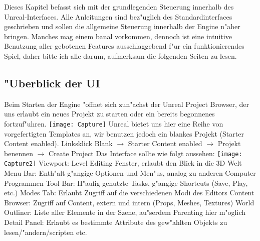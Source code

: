 \documentclass[11pt, titlepage]{article}
\begin{document}
\noindent Dieses Kapitel befasst sich mit der grundlegenden Steuerung innerhalb des Unreal-Interfaces. Alle Anleitungen sind bez"uglich des Standardinterfaces geschrieben und sollen die allgemeine Steuerung innerhalb der Engine n"aher bringen. Manches mag einem banal vorkommen, dennoch ist eine intuitive Benutzung aller gebotenen Features ausschlaggebend f"ur ein funktionierendes Spiel, daher bitte ich alle darum, aufmerksam die folgenden Seiten zu lesen.

\subsection{"Uberblick der UI}

\noindent Beim Starten der Engine "offnet sich zun"achst der Unreal Project Browser, der uns erlaubt ein neues Projekt zu starten oder ein bereits begonnenes fortzuf"uhren. \newline
\newline
\texttt{[image: Capture]}
\newline
\noindent Unreal bietet uns hier eine Reihe von vorgefertigten Templates an, wir benutzen jedoch ein blankes Projekt (Starter Content enabled). \newline
\newline
\noindent Linksklick Blank $\rightarrow$ Starter Content enabled $\rightarrow$ Projekt benennen $\rightarrow$ Create Project \newline
\newpage
\noindent Das Interface sollte wie folgt aussehen: \newline
\newline
\texttt{[image: Capture2]}
\newline
{} Viewport: Level Editing Fenster, erlaubt den Blick in die 3D Welt \newline
{} Menu Bar: Enth"alt g"angige Optionen und Men"us, analog zu anderen Computer Programmen \newline
{} Tool Bar: H"aufig genutzte Tasks, g"angige Shortcuts (Save, Play, etc.) \newline
{} Modes Tab: Erlaubt Zugriff auf die verschiedenen Modi des Editors \newline
{} Content Browser: Zugriff auf Content, extern und intern (Props, Meshes, Textures) \newline
{} World Outliner: Liste aller Elemente in der Szene, au"serdem Parenting hier m"oglich \newline
{} Detail Panel: Erlaubt es bestimmte Attribute des gew"ahlten Objekts zu lesen/"andern/scripten etc.
\newpage
\end{document}
